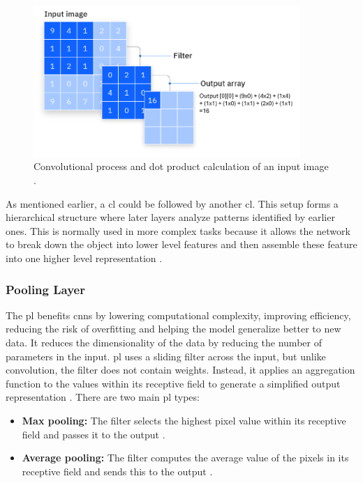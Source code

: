 \begin{figure}[ht]
    \centering
    \includegraphics[width=0.9\textwidth]{Figures/CNN_CL.PNG} 
    \caption{Convolutional process and dot product calculation of an input image \cite{ibm_cnn}.}
    \label{cnn_cl}
\end{figure}

As mentioned earlier, a \gls{cl} could be followed by another \gls{cl}. This setup forms a hierarchical structure where later layers analyze patterns identified by earlier ones. This is normally used in more complex tasks because it allows the network to break down the object into lower level features and then assemble these feature into one higher level representation \cite{ibm_cnn}.

\subsubsection{Pooling Layer}
The \gls{pl} benefits \gls{cnn}s by lowering computational complexity, improving efficiency, reducing the risk of overfitting and helping the model generalize better to new data. It reduces the dimensionality of the data by reducing the number of parameters in the input. \gls{pl} uses a sliding filter across the input, but unlike convolution, the filter does not contain weights. Instead, it applies an aggregation function to the values within its receptive field to generate a simplified output representation \cite{ibm_cnn}. There are two main \gls{pl} types:

\begin{itemize}
    \item \textbf{Max pooling:} The filter selects the highest pixel value within its receptive field and passes it to the output \cite{ibm_cnn}.
     \item \textbf{Average pooling:} The filter computes the average value of the pixels in its receptive field and sends this to the output \cite{ibm_cnn}.
\end{itemize}

